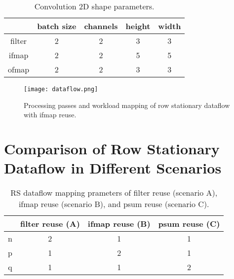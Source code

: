 \documentclass[12pt]{article}
\begin{document}
\begin{table}[h]
    \centering
    \begin{tabular}{c|cccc}
    \hline
           & batch size & channels & height & width \\ \hline
    filter & 2          &  2       & 3      & 3     \\ \hline
    ifmap  & 2          &  2       & 5      & 5     \\ \hline
    ofmap  & 2          &  2       & 3      & 3     \\ \hline
    \end{tabular}
    \caption{Convolution 2D shape parameters.}
\end{table}

\begin{figure}[h]
    \centering
    \texttt{[image: dataflow.png]}
    \caption{Processing passes and workload mapping of row stationary dataflow with ifmap reuse.}
    \label{fig:mul_arch2}
\end{figure}
\newpage

\section{Comparison of Row Stationary Dataflow in Different Scenarios}

\begin{table}[h]
    \centering
    \begin{tabular}{|c|c|c|c|}
    \hline
        & filter reuse (A) & ifmap reuse (B) & psum reuse (C) \\ \hline
    n   &     2            &        1        &      1          \\ \hline
    p   &   1              &        2        &      1          \\ \hline
    q   &      1           &        1        &      2          \\ \hline
    \end{tabular}
    \caption{RS dataflow mapping prameters of filter reuse (scenario A), ifmap reuse (scenario B), and psum reuse (scenario C).}
\end{table}
\end{document}
